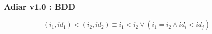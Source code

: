 \documentclass[english, aspectratio=169]{beamer}
\begin{document}
\begin{frame}
  \frametitle{Adiar v1.0 : BDD}

  \begin{center}
    \begin{tikzpicture}[scale=0.9, every node/.style={transform shape}]
      
    \end{tikzpicture}
  \end{center}
  \vspace{20pt}\pause
  \begin{equation*}
    \label{eq:ordering}
    (i_1, \mathit{id}_1) < (i_2, \mathit{id}_2)
    \equiv
    i_1 < i_2 \vee (i_1 = i_2 \wedge \mathit{id}_i < \mathit{id}_j)
  \end{equation*}
\end{frame}
\end{document}
